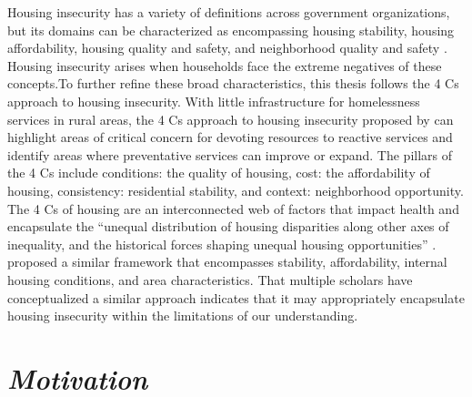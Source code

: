 Housing insecurity has a variety of definitions across government organizations, but its domains can be characterized as encompassing housing stability, housing affordability, housing quality and safety, and neighborhood quality and safety \citep{cox_road_2019}. Housing insecurity arises when households face the extreme negatives of these concepts.To further refine these broad characteristics, this thesis follows the 4 Cs approach to housing insecurity. With little infrastructure for homelessness services in rural areas, the 4 Cs approach to housing insecurity proposed by \citet{hernandez_housing_2019} can highlight areas of critical concern for devoting resources to reactive services and identify areas where preventative services can improve or expand. The pillars of the 4 Cs include conditions: the quality of housing, cost: the affordability of housing, consistency: residential stability, and context: neighborhood opportunity. The 4 Cs of housing are an interconnected web of factors that impact health and encapsulate the “unequal distribution of housing disparities along other axes of inequality, and the historical forces shaping unequal housing opportunities” \citep[1]{hernandez_housing_2019}. \citet{metzger_fair_2017} proposed a similar framework that encompasses stability, affordability, internal housing conditions, and area characteristics. That multiple scholars have conceptualized a similar approach indicates that it may appropriately encapsulate housing insecurity within the limitations of our understanding.

 

\section{\textit{Motivation}} 

